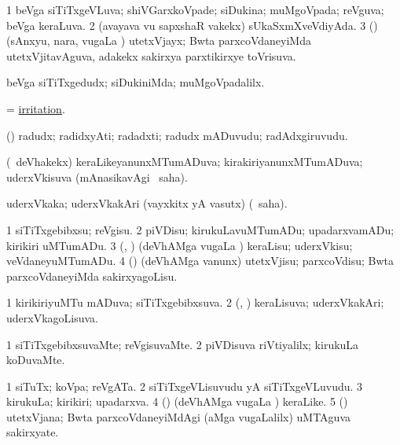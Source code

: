 \bentry
{}
\gl{\gu}
\bmng
\bnum
\num{1} beVga siTiTxgeVLuva; shiVGarxkoVpade; siDukina; muMgoVpada; reVguva; beVga keraLuva. 
\num{2} (avayava \mo vu sapxshaR \mo vakekx) sUkaSxmXveVdiyAda. 
\num{3} (\jiVvi) (sAnxyu, nara, \mo vugaLa \vi) utetxVjayx; Bwta parxcoVdaneyiMda utetxVjitavAguva, adakekx sakirxya parxtikirxye toVrisuva. 
\enum
\emng
\eentry

\bentry
{}
\gl{\kirxvi}
\bmng
beVga siTiTxgedudx; siDukiniMda; muMgoVpadalilx. 
\emng
\eentry

\bentry
{}
\gl{\nA}
\bmng
= \hyperlink{irritation}{irritation}. 
\emng
\eentry

\bentry
{}
\gl{\nA}
\bmng
(\nAyxshA) radudx; radidxyAti; radadxti; radudx mADuvudu; radAdxgiruvudu. 
\emng
\eentry

\bentry
{}
\gl{\gu}
\bmng
(\kanmu\ deVhakekx) keraLikeyanunxMTumADuva; kirakiriyanunxMTumADuva; uderxVkisuva (mAnasikavAgi \rUpa\ saha). 
\emng
\eentry

\bentry
{}
\gl{\nA}
\bmng
uderxVkaka; uderxVkakAri (vayxkitx yA vasutx) (\rUpa\ saha). 
\emng
\eentry

\bentry
{}
\gl{\sakirx}
\bmng
\bnum
\num{1} siTiTxgebibxsu; reVgisu. 
\num{2} piVDisu; kirukuLavuMTumADu; upadarxvamADu; kirikiri uMTumADu. 
\num{3} (\shavi, \roVshA) (deVhAMga \mo vugaLa \vi) keraLisu; uderxVkisu; veVdaneyuMTumADu. 
\num{4} (\jiVvi) (deVhAMga \mo vanunx) utetxVjisu; parxcoVdisu; Bwta parxcoVdaneyiMda sakirxyagoLisu. 
\enum
\emng
\eentry

\bentry
{}
\gl{\gu}
\bmng
\bnum
\num{1} kirikiriyuMTu mADuva; siTiTxgebibxsuva. 
\num{2} (\shavi, \roVshA) keraLisuva; uderxVkakAri; uderxVkagoLisuva. 
\enum
\emng
\eentry

\bentry
{}
\gl{\kirxvi}
\bmng
\bnum
\num{1} siTiTxgebibxsuvaMte; reVgisuvaMte. 
\num{2} piVDisuva riVtiyalilx; kirukuLa koDuvaMte. 
\enum
\emng
\eentry

\bentry
{}
\gl{\nA}
\bmng
\bnum
\num{1} siTuTx; koVpa; reVgATa. 
\num{2} siTiTxgeVLisuvudu yA siTiTxgeVLuvudu. 
\num{3} kirukuLa; kirikiri; upadarxva. 
\num{4} (\shavi) (deVhAMga \mo vugaLa \vi) keraLike. 
\num{5} (\jiVvi) utetxVjana; Bwta parxcoVdaneyiMdAgi (aMga \mo vugaLalilx) uMTAguva sakirxyate. 
\enum
\emng
\eentry

